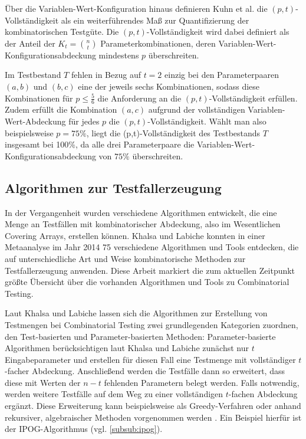 Über die Variablen-Wert-Konfiguration hinaus definieren Kuhn et al. \cite{kuhn2010practical} die $(p,t)$-Vollständigkeit als ein weiterführendes Maß zur Quantifizierung der kombinatorischen Testgüte. Die $(p,t)$-Vollständigkeit wird dabei definiert als der Anteil der $K_t = \binom{n}{t}$ Parameterkombinationen, deren Variablen-Wert-Konfigurationsabdeckung mindestens $p$ überschreiten.

Im Testbestand $T$ fehlen in Bezug auf $t=2$ einzig bei den Parameterpaaren $(a,b)$ und $(b,c)$ eine der jeweils sechs Kombinationen, sodass diese Kombinationen für $p \leq \frac{5}{6}$ die Anforderung an die $(p,t)$-Vollständigkeit erfüllen. Zudem erfüllt die Kombination $(a,c)$ aufgrund der vollständigen Variablen-Wert-Abdeckung für jedes $p$ die $(p,t)$-Vollständigkeit. Wählt man also beispielsweise $p=75\%$, liegt die (p,t)-Vollständigkeit des Testbestands $T$ insgesamt bei 100\%, da alle drei Parameterpaare die Variablen-Wert-Konfigurationsabdeckung von $75\%$ überschreiten.

\subsection{Algorithmen zur Testfallerzeugung}\label{subsec:algo}

In der Vergangenheit wurden verschiedene Algorithmen entwickelt, die eine Menge an Testfällen mit kombinatorischer Abdeckung, also im Wesentlichen Covering Arrays, erstellen können. Khalsa und Labiche \cite{khalsa2014orchestrated} konnten in einer Metaanalyse im Jahr 2014 75 verschiedene Algorithmen und Tools entdecken, die auf unterschiedliche Art und Weise kombinatorische Methoden zur Testfallerzeugung anwenden. Diese Arbeit markiert die zum aktuellen Zeitpunkt größte Übersicht über die vorhanden Algorithmen und Tools zu Combinatorial Testing.

Laut Khalsa und Labiche \cite{khalsa2014orchestrated} lassen sich die Algorithmen zur Erstellung von Testmengen bei Combinatorial Testing zwei grundlegenden Kategorien zuordnen, den Test-basierten und Parameter-basierten Methoden: Parameter-basierte Algorithmen berücksichtigen laut Khalsa und Labiche \cite{khalsa2014orchestrated} zunächst nur $t$ Eingabeparameter und erstellen für diesen Fall eine Testmenge mit vollständiger $t$-facher Abdeckung. Anschließend werden die Testfälle dann so erweitert, dass diese mit Werten der $n-t$ fehlenden Parametern belegt werden. Falls notwendig, werden weitere Testfälle auf dem Weg zu einer vollständigen $t$-fachen Abdeckung ergänzt. Diese Erweiterung kann beispielsweise als Greedy-Verfahren oder anhand rekursiver, algebraischer Methoden vorgenommen werden \cite{khalsa2014orchestrated}. Ein Beispiel hierfür ist der IPOG-Algorithmus (vgl. \autoref{subsub:ipog}).

